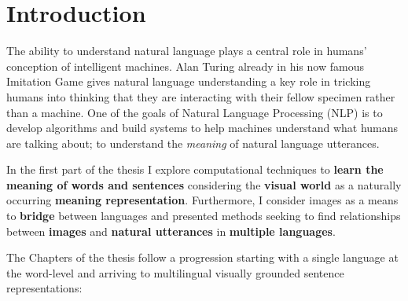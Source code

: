 

\chapter{Introduction}
\label{ch:introduction}

The ability to understand natural language plays a central role in humans' conception of intelligent machines.
Alan Turing already in his now famous Imitation Game \citep{machinery1950computing} 
gives natural language understanding a
key role in tricking humans into thinking that they are interacting with their fellow specimen rather
than a machine. One of the goals of Natural Language Processing (NLP) is to develop algorithms
and build systems to help machines understand what humans are talking about; to
understand the \emph{meaning} of natural language utterances.

In the first part of the thesis I explore computational techniques to
\textbf{learn the meaning of words and  sentences} 
considering the \textbf{visual world} as a naturally occurring
\textbf{meaning representation}. Furthermore, I consider images
as a means to \textbf{bridge} between languages and 
presented methods seeking to find relationships between \textbf{images} and
\textbf{natural utterances} in \textbf{multiple languages}.


The  Chapters of the thesis follow a progression
starting with a single language at the word-level and arriving to multilingual visually grounded sentence
representations:

